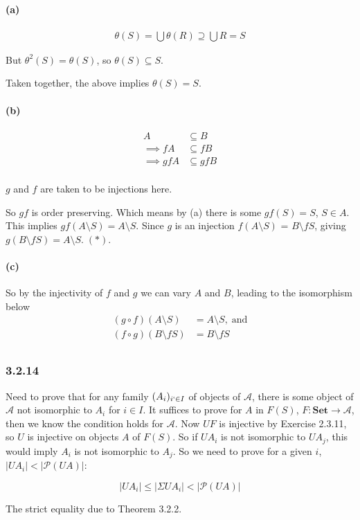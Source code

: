 \documentclass{article}
\begin{document}
\paragraph{(a)}

\begin{align*}
  \theta(S) = \bigcup \theta(R) \supseteq \bigcup R = S
\end{align*}

But $\theta^2(S) = \theta(S)$, so $\theta(S) \subseteq S$.

Taken together, the above implies $\theta(S) = S$.

\paragraph{(b)}
\begin{align*}
  A &\subseteq B \\
  \implies fA &\subseteq fB \\
  \implies gfA &\subseteq gfB \\
\end{align*}

$g$ and $f$ are taken to be injections here.

So $gf$ is order preserving. Which means by (a) there is some $gf(S) = S$, $S \in A$.
This implies $gf(A \setminus S) = A \setminus S$. Since $g$ is an injection $f(A \setminus S)$ = $B \setminus fS$, giving
$ g(B \setminus fS) = A \setminus S.\; (*)$.

\paragraph{(c)}

So by the injectivity of $f$ and $g$ we can vary $A$ and $B$, leading to the isomorphism below
\begin{align*}
  (g \circ f)(A \setminus S) &= A \setminus S, \; \text{and} \\
  (f \circ g)(B \setminus fS) &= B \setminus fS \\
\end{align*}

\subsubsection*{3.2.14}

Need to prove that for any family $(A_i)_{i `\in I}$  of objects of $\mathcal{A}$, there is some object of $\mathcal{A}$ not isomorphic to $A_i$ for $i \in I$.
It suffices to prove for $A$ in $F(S)$,  $F: \mathbf{Set} \rightarrow \mathcal{A}$, then we know the condition holds for $\mathcal{A}$. Now $UF$ is injective by Exercise 2.3.11,
so $U$ is injective on objects $A$ of $F(S)$. So if $UA_i$ is not isomorphic to $UA_j$, this would imply $A_i$ is not isomorphic to $A_j$. So we need to prove for a given $i$,  $|UA_i| < |\mathcal{P}(UA)|$:

\begin{equation*}
  |UA_i| \leq |\Sigma UA_i| < |\mathcal{P}(UA)|
\end{equation*}

The strict equality due to Theorem 3.2.2.
\end{document}
